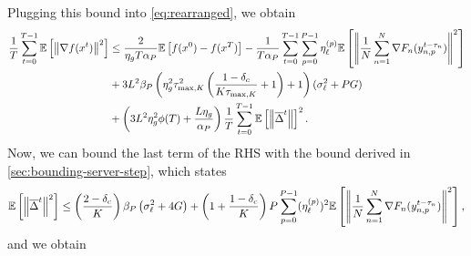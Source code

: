 Plugging this bound into \eqref{eq:rearranged}, we obtain
\begin{equation}
    \begin{aligned}
        \frac{1}{T} \sum_{t=0}^{T-1} \mathbb{E}\left[\left\lVert\nabla f(x^t)\right\rVert^2\right] & \leq \frac{2}{\eta_g T \alpha_P}\mathbb{E}\left[f(x^{0}) - f(x^T)\right]  - \frac{1}{T\alpha_P} \sum_{t=0}^{T-1} \sum_{p=0}^{P-1}\eta_{\ell}^{(p)} \mathbb{E}\left[\left\lVert\frac{1}{N}\sum_{n = 1}^N \nabla F_n(y^{t-\tau_n}_{n,p})\right\rVert^2\right] \\
                                                                    & + 3 L^2 \beta_P \left( \eta^2_g \tau_{\max,K}^2 \left (\frac{1-\delta_c}{K \tau_{\max, K}} + 1 \right) + 1 \right)  (\sigma_{\ell}^2 + PG)                                                                    \\
                                                                    & +  \left( 3L^2 \eta_g^2 \phi(T) + \frac{L \eta_g}{\alpha_P} \right) \frac{1}{T} \sum_{t=0}^{T-1} \mathbb{E}\left[\left\lVert\overline{\Delta}^t\right\rVert\right]^2.
    \end{aligned}
\end{equation}
Now, we can bound the last term of the RHS with the bound derived in \cref{sec:bounding-server-step}, which states
\begin{equation}
    \mathbb{E}\left[\left\lVert\overline{\Delta}^t \right\rVert^2\right] \leq \left(\frac{2-\delta_c}{K}\right)\beta_P \left(\sigma_{\ell}^2 + 4G\right) + \left(1 + \frac{1-\delta_c}{K}\right)P  \sum_{p=0}^{P-1}   (\eta^{(p)}_{\ell})^2 \mathbb{E}\left[\left\lVert\frac{1}{N} \sum_{n = 1}^N \nabla F_n(y^{t-\tau_n}_{n,p}) \right\rVert^2\right],
\end{equation}
and we obtain
